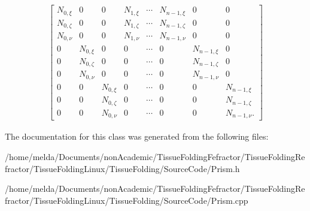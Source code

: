 \begin{eqnarray*} \begin{bmatrix} N_{0,\xi} & 0 & 0 & N_{1,\xi} & \cdots &N_{n-1,\xi} & 0 & 0 \\ N_{0,\zeta} & 0 & 0 & N_{1,\zeta} & \cdots &N_{n-1,\zeta} & 0 & 0 \\ N_{0,\nu} & 0 & 0 & N_{1,\nu} & \cdots &N_{n-1,\nu} & 0 & 0 \\ 0 & N_{0,\xi} & 0 & 0 & \cdots &0 & N_{n-1,\xi} & 0 \\ 0 & N_{0,\zeta} & 0 & 0 & \cdots &0 & N_{n-1,\zeta} & 0 \\ 0 & N_{0,\nu} & 0 & 0 & \cdots &0 & N_{n-1,\nu} & 0 \\ 0 & 0 & N_{0,\xi} & 0 & \cdots &0 &0 & N_{n-1,\xi} \\ 0 & 0 & N_{0,\zeta} & 0 & \cdots &0 &0 & N_{n-1,\zeta} \\ 0 & 0 & N_{0,\nu} & 0 & \cdots &0 &0 & N_{n-1,\nu} . \end{bmatrix} \end{eqnarray*}

The documentation for this class was generated from the following files\+:\begin{DoxyCompactItemize}
\item 
/home/melda/\+Documents/non\+Academic/\+Tissue\+Folding\+Fefractor/\+Tissue\+Folding\+Refractor/\+Tissue\+Folding\+Linux/\+Tissue\+Folding/\+Source\+Code/Prism.\+h\item 
/home/melda/\+Documents/non\+Academic/\+Tissue\+Folding\+Fefractor/\+Tissue\+Folding\+Refractor/\+Tissue\+Folding\+Linux/\+Tissue\+Folding/\+Source\+Code/Prism.\+cpp\end{DoxyCompactItemize}
